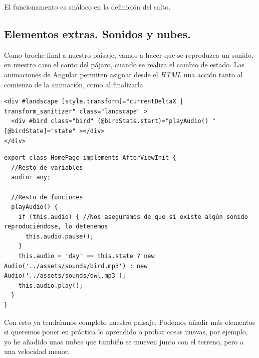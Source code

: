 El funcionamento es análoco en la definición del salto.

\subsection{Elementos extras. Sonidos y nubes.}


Como broche final a nuestro paisaje, vamos a hacer que se reproduzca un sonido, en nuestro caso el canto del pájaro, cuando se realiza el cambio de estado. Las animaciones de Angular permiten asignar desde el \emph{HTML} una acción tanto al comienzo de la animación, como al finalizarla.

{\begin{lstlisting}[style=htmlcssjs,frame=tlrb, xleftmargin={0.2cm}]
<div #landscape [style.transform]="currentDeltaX | transform_sanitizer" class="landscape" >
  <div #bird class="bird" (@birdState.start)="playAudio() " [@birdState]="state" ></div>
</div>
\end{lstlisting}}

{\begin{lstlisting}[style=htmlcssjs,frame=tlrb, xleftmargin={0.2cm}]
export class HomePage implements AfterViewInit {
  //Resto de variables
  audio: any;

  //Resto de funciones
  playAudio() {
    if (this.audio) { //Nos aseguramos de que si existe algún sonido reproduciéndose, lo detenemos
      this.audio.pause();
    }
    this.audio = 'day' == this.state ? new Audio('../assets/sounds/bird.mp3') : new Audio('../assets/sounds/owl.mp3');
    this.audio.play();
  }
}
\end{lstlisting}}

Con esto ya tendríamos completo nuestro paisaje. Podemos añadir más elementos si queremos poner en práctica lo aprendido o probar cosas nuevas, por ejemplo, yo he añadido unas nubes que también se mueven junto con el terreno, pero a una velocidad menor.

